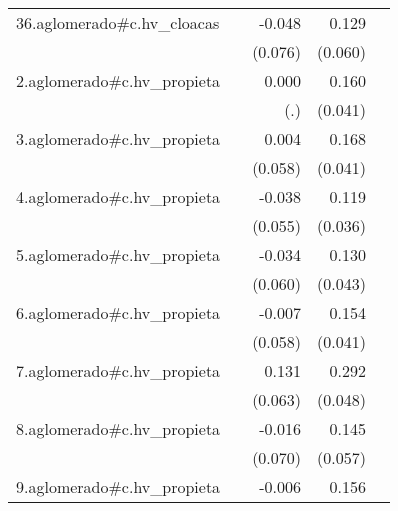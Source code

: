 {\begin{longtable}{l*{4}{D{.}{.}{-1}}}
\addlinespace
36.aglomerado#c.hv\_cloacas&                     &      -0.048         &       0.129\sym{*}  &                     \\
            &                     &     (0.076)         &     (0.060)         &                     \\
\addlinespace
2.aglomerado#c.hv\_propieta&                     &       0.000         &       0.160\sym{***}&                     \\
            &                     &         (.)         &     (0.041)         &                     \\
\addlinespace
3.aglomerado#c.hv\_propieta&                     &       0.004         &       0.168\sym{***}&                     \\
            &                     &     (0.058)         &     (0.041)         &                     \\
\addlinespace
4.aglomerado#c.hv\_propieta&                     &      -0.038         &       0.119\sym{***}&                     \\
            &                     &     (0.055)         &     (0.036)         &                     \\
\addlinespace
5.aglomerado#c.hv\_propieta&                     &      -0.034         &       0.130\sym{**} &                     \\
            &                     &     (0.060)         &     (0.043)         &                     \\
\addlinespace
6.aglomerado#c.hv\_propieta&                     &      -0.007         &       0.154\sym{***}&                     \\
            &                     &     (0.058)         &     (0.041)         &                     \\
\addlinespace
7.aglomerado#c.hv\_propieta&                     &       0.131\sym{*}  &       0.292\sym{***}&                     \\
            &                     &     (0.063)         &     (0.048)         &                     \\
\addlinespace
8.aglomerado#c.hv\_propieta&                     &      -0.016         &       0.145\sym{*}  &                     \\
            &                     &     (0.070)         &     (0.057)         &                     \\
\addlinespace
9.aglomerado#c.hv\_propieta&                     &      -0.006         &       0.156\sym{**} &                     \\

\end{longtable}}
